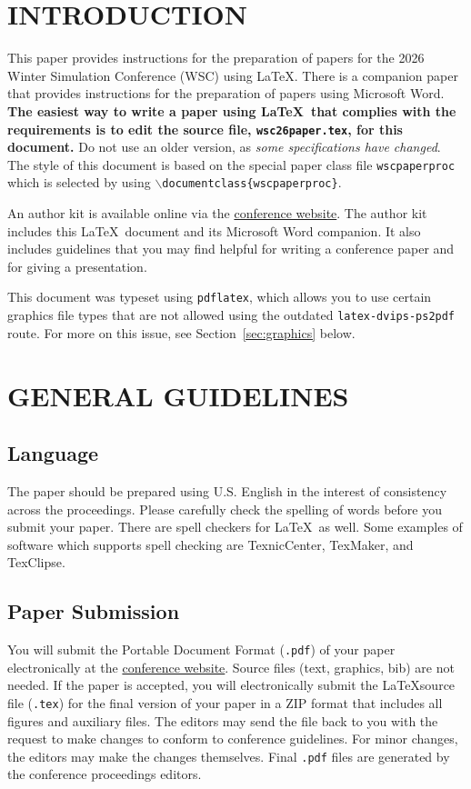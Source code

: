 \documentclass{wscpaperproc}
\theoremstyle{wsc}
\begin{document}
\section{INTRODUCTION}
\label{sec:intro}

This paper provides instructions for the preparation of papers for the 2026
Winter Simulation Conference (WSC) using \LaTeX. There is a companion paper that
provides instructions for the preparation of papers using Microsoft Word. \textbf{The easiest way to write a paper using \LaTeX\ that complies with the
requirements is to edit the source file, {\tt wsc26paper.tex}, for this document.}
Do not use an older version, as \textit{some specifications have changed}.
The style of this document is based on the special paper class file {\tt wscpaperproc} which is selected by using {\tt $\backslash$documentclass\{wscpaperproc\}}.

An author kit is available online via the \href{http://www.wintersim.org}%
{conference website}.
The author kit includes this \LaTeX\ document and its Microsoft Word companion.
It also includes guidelines that you may find helpful for writing a conference paper and for giving a presentation.

This document was typeset using {\tt pdflatex}, which allows you to use certain
graphics file types that are not allowed using the outdated {\tt latex-dvips-ps2pdf} route.
For more on this issue, see Section~\ref{sec:graphics} below.

\section{GENERAL GUIDELINES}

\subsection{Language}
The paper should be prepared using U.S. English in the interest of consistency across the proceedings. Please carefully check the spelling of words before you submit your paper. There are spell checkers for \LaTeX\ as well.
Some examples of software which supports spell checking are TexnicCenter, TexMaker, and TexClipse.

\subsection{Paper Submission}
You will submit the Portable Document Format ({\tt .pdf}) of your paper electronically at the \href{http://www.wintersim.org}{conference website}. Source files (text, graphics, bib) are not needed. If the paper is accepted, you will electronically submit the \LaTeX source file ({\tt .tex}) for the final version of your paper in a ZIP format that includes all figures and auxiliary files.
The editors may send the file back to you with the request to make changes to conform to conference guidelines. For minor changes, the editors may make the changes themselves. Final {\tt .pdf} files are generated by the conference proceedings editors.
\end{document}
